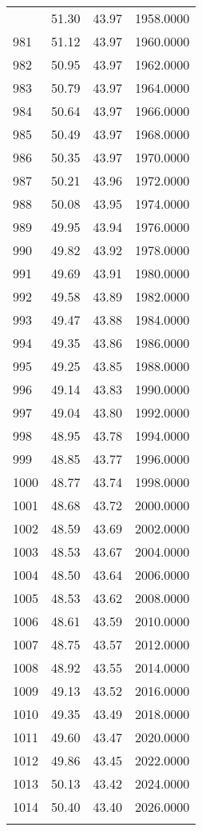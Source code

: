 \documentclass[
  captions=tableheading,
]{scrartcl}
\begin{document}
\begin{longtable} {l|l|l|l}
{980 &	51.30 &	43.97 &	1958.0000\\
981 &	51.12 &	43.97 &	1960.0000\\
982 &	50.95 &	43.97 &	1962.0000\\
983 &	50.79 &	43.97 &	1964.0000\\
984 &	50.64 &	43.97 &	1966.0000\\
985 &	50.49 &	43.97 &	1968.0000\\
986 &	50.35 &	43.97 &	1970.0000\\
987 &	50.21 &	43.96 &	1972.0000\\
988 &	50.08 &	43.95 &	1974.0000\\
989 &	49.95 &	43.94 &	1976.0000\\
990 &	49.82 &	43.92 &	1978.0000\\
991 &	49.69 &	43.91 &	1980.0000\\
992 &	49.58 &	43.89 &	1982.0000\\
993 &	49.47 &	43.88 &	1984.0000\\
994 &	49.35 &	43.86 &	1986.0000\\
995 &	49.25 &	43.85 &	1988.0000\\
996 &	49.14 &	43.83 &	1990.0000\\
997 &	49.04 &	43.80 &	1992.0000\\
998 &	48.95 &	43.78 &	1994.0000\\
999 &	48.85 &	43.77 &	1996.0000\\
1000 &	48.77 &	43.74 &	1998.0000\\
1001 &	48.68 &	43.72 &	2000.0000\\
1002 &	48.59 &	43.69 &	2002.0000\\
1003 &	48.53 &	43.67 &	2004.0000\\
1004 &	48.50 &	43.64 &	2006.0000\\
1005 &	48.53 &	43.62 &	2008.0000\\
1006 &	48.61 &	43.59 &	2010.0000\\
1007 &	48.75 &	43.57 &	2012.0000\\
1008 &	48.92 &	43.55 &	2014.0000\\
1009 &	49.13 &	43.52 &	2016.0000\\
1010 &	49.35 &	43.49 &	2018.0000\\
1011 &	49.60 &	43.47 &	2020.0000\\
1012 &	49.86 &	43.45 &	2022.0000\\
1013 &	50.13 &	43.42 &	2024.0000\\
1014 &	50.40 &	43.40 &	2026.0000\\
}
\end{longtable}
\end{document}
